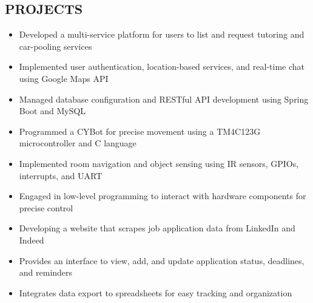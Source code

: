 \documentclass[letterpaper,11pt]{article}
\begin{document}
\begin{resume}
\section{PROJECTS}
\begin{itemize}
    \item Developed a multi-service platform for users to list and request tutoring and car-pooling services
    \item Implemented user authentication, location-based services, and real-time chat using Google Maps API
    \item Managed database configuration and RESTful API development using Spring Boot and MySQL
\end{itemize}
\begin{itemize}
    \item Programmed a CYBot for precise movement using a TM4C123G microcontroller and C language
    \item Implemented room navigation and object sensing using IR sensors, GPIOs, interrupts, and UART
    \item Engaged in low-level programming to interact with hardware components for precise control
\end{itemize}
\begin{itemize}  
    \item Developing a website that scrapes job application data from LinkedIn and Indeed
    \item Provides an interface to view, add, and update application status, deadlines, and reminders
    \item Integrates data export to spreadsheets for easy tracking and organization
\end{itemize}
\end{resume}
\end{document}
